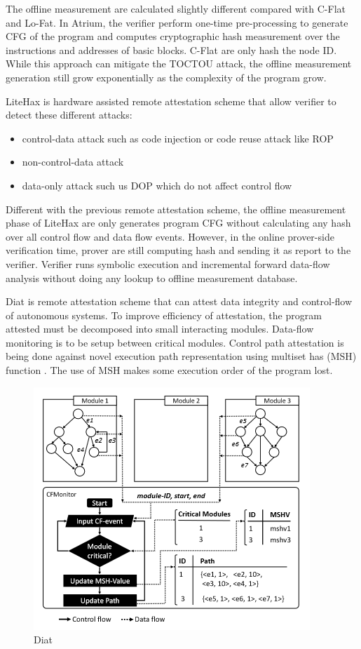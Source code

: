 The offline measurement are calculated slightly different compared with C-Flat and Lo-Fat. In Atrium, the verifier perform one-time pre-processing to generate CFG of the program and computes cryptographic hash measurement over the instructions and addresses of basic blocks. C-Flat are only hash the node ID. While this approach can mitigate the TOCTOU attack, the offline measurement generation still grow exponentially as the complexity of the program grow. 

LiteHax \cite{dessoukyLiteHAXLightweightHardwareassisted2018} is hardware assisted remote attestation scheme that allow verifier to detect these different attacks:

\begin{itemize}
    \item control-data attack such as code injection or code reuse attack like ROP
    \item non-control-data attack
    \item data-only attack such us DOP which do not affect control flow
\end{itemize}

Different with the previous remote attestation scheme, the offline measurement phase of LiteHax are only generates program CFG without calculating any hash over all control flow and data flow events. However, in the online prover-side verification time, prover are still computing hash and sending it as report to the verifier. Verifier runs symbolic execution and incremental forward data-flow analysis without doing any lookup to offline measurement database.

Diat \cite{aberaDIATDataIntegrity2019} is remote attestation scheme that can attest data integrity and control-flow of autonomous systems. To improve efficiency of attestation, the program attested must be decomposed into small interacting modules. Data-flow monitoring is to be setup between critical modules. Control path attestation is being done against novel execution path representation using multiset has (MSH) function \cite{clarkeIncrementalMultisetHash2003}. The use of MSH makes some execution order of the program lost.

\begin{figure}[htbp]
\centerline{\includegraphics[scale=.5]{Figures/01/diat.png}}
\caption{Diat}
\label{fig:diat}
\end{figure}


